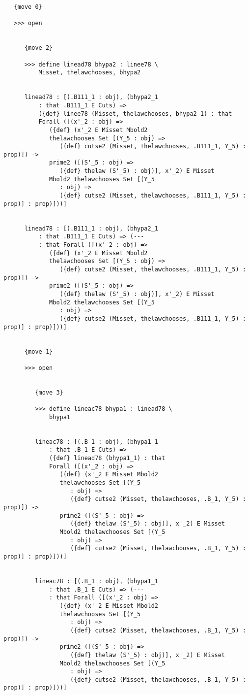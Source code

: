 \documentclass[12pt]{article}
\begin{document}
\begin{verbatim}
   {move 0}

   >>> open


      {move 2}

      >>> define linead78 bhypa2 : linee78 \
          Misset, thelawchooses, bhypa2


      linead78 : [(.B111_1 : obj), (bhypa2_1 
          : that .B111_1 E Cuts) => 
          ({def} linee78 (Misset, thelawchooses, bhypa2_1) : that 
          Forall ([(x'_2 : obj) => 
             ({def} (x'_2 E Misset Mbold2 
             thelawchooses Set [(Y_5 : obj) => 
                ({def} cutse2 (Misset, thelawchooses, .B111_1, Y_5) : prop)]) -> 
             prime2 ([(S'_5 : obj) => 
                ({def} thelaw (S'_5) : obj)], x'_2) E Misset 
             Mbold2 thelawchooses Set [(Y_5 
                : obj) => 
                ({def} cutse2 (Misset, thelawchooses, .B111_1, Y_5) : prop)] : prop)]))]


      linead78 : [(.B111_1 : obj), (bhypa2_1 
          : that .B111_1 E Cuts) => (--- 
          : that Forall ([(x'_2 : obj) => 
             ({def} (x'_2 E Misset Mbold2 
             thelawchooses Set [(Y_5 : obj) => 
                ({def} cutse2 (Misset, thelawchooses, .B111_1, Y_5) : prop)]) -> 
             prime2 ([(S'_5 : obj) => 
                ({def} thelaw (S'_5) : obj)], x'_2) E Misset 
             Mbold2 thelawchooses Set [(Y_5 
                : obj) => 
                ({def} cutse2 (Misset, thelawchooses, .B111_1, Y_5) : prop)] : prop)]))]


      {move 1}

      >>> open


         {move 3}

         >>> define lineac78 bhypa1 : linead78 \
             bhypa1


         lineac78 : [(.B_1 : obj), (bhypa1_1 
             : that .B_1 E Cuts) => 
             ({def} linead78 (bhypa1_1) : that 
             Forall ([(x'_2 : obj) => 
                ({def} (x'_2 E Misset Mbold2 
                thelawchooses Set [(Y_5 
                   : obj) => 
                   ({def} cutse2 (Misset, thelawchooses, .B_1, Y_5) : prop)]) -> 
                prime2 ([(S'_5 : obj) => 
                   ({def} thelaw (S'_5) : obj)], x'_2) E Misset 
                Mbold2 thelawchooses Set [(Y_5 
                   : obj) => 
                   ({def} cutse2 (Misset, thelawchooses, .B_1, Y_5) : prop)] : prop)]))]


         lineac78 : [(.B_1 : obj), (bhypa1_1 
             : that .B_1 E Cuts) => (--- 
             : that Forall ([(x'_2 : obj) => 
                ({def} (x'_2 E Misset Mbold2 
                thelawchooses Set [(Y_5 
                   : obj) => 
                   ({def} cutse2 (Misset, thelawchooses, .B_1, Y_5) : prop)]) -> 
                prime2 ([(S'_5 : obj) => 
                   ({def} thelaw (S'_5) : obj)], x'_2) E Misset 
                Mbold2 thelawchooses Set [(Y_5 
                   : obj) => 
                   ({def} cutse2 (Misset, thelawchooses, .B_1, Y_5) : prop)] : prop)]))]



\end{verbatim}
\end{document}
